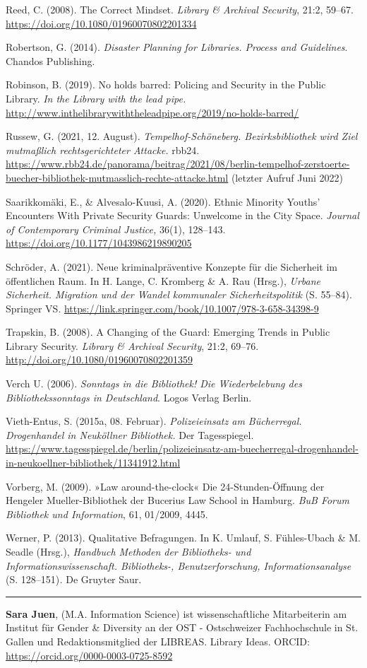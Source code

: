 \documentclass[a4paper,
fontsize=11pt,
oneside,
numbers=noperiodatend,
parskip=half-,
bibliography=totoc,
final
]{scrartcl}
\begin{document}
Reed, C. (2008). The Correct Mindset. \emph{Library \& Archival
Security}, 21:2, 59--67. \url{https://doi.org/10.1080/01960070802201334}

Robertson, G. (2014). \emph{Disaster Planning for Libraries. Process and
Guidelines}. Chandos Publishing.

Robinson, B. (2019). No holds barred: Policing and Security in the
Public Library. \emph{In the Library with the lead pipe.}
\url{http://www.inthelibrarywiththeleadpipe.org/2019/no-holds-barred/}

Russew, G. (2021, 12. August). \emph{Tempelhof-Schöneberg.
Bezirksbibliothek wird Ziel mutmaßlich rechtsgerichteter Attacke.}
rbb24.
\url{https://www.rbb24.de/panorama/beitrag/2021/08/berlin-tempelhof-zerstoerte-buecher-bibliothek-mutmasslich-rechte-attacke.html}
(letzter Aufruf Juni 2022)

Saarikkomäki, E., \& Alvesalo-Kuusi, A. (2020). Ethnic Minority Youths'
Encounters With Private Security Guards: Unwelcome in the City Space.
\emph{Journal of Contemporary Criminal Justice,} 36(1), 128--143.
\url{https://doi.org/10.1177/1043986219890205}

Schröder, A. (2021). Neue kriminalpräventive Konzepte für die Sicherheit
im öffentlichen Raum. In H. Lange, C. Kromberg \& A. Rau (Hrsg.),
\emph{Urbane Sicherheit. Migration und der Wandel kommunaler
Sicherheitspolitik} (S. 55--84). Springer VS.
\url{https://link.springer.com/book/10.1007/978-3-658-34398-9}

Trapskin, B. (2008). A Changing of the Guard: Emerging Trends in Public
Library Security. \emph{Library \& Archival Security}, 21:2, 69--76.
\url{http://doi.org/10.1080/01960070802201359}

Verch U. (2006). \emph{Sonntags in die Bibliothek! Die Wiederbelebung
des Bibliothekssonntags in Deutschland}. Logos Verlag Berlin.

Vieth-Entus, S. (2015a, 08. Februar). \emph{Polizeieinsatz am
Bücherregal. Drogenhandel in Neuköllner Bibliothek.} Der Tagesspiegel.
\url{https://www.tagesspiegel.de/berlin/polizeieinsatz-am-buecherregal-drogenhandel-in-neukoellner-bibliothek/11341912.html}

Vorberg, M. (2009). »Law around-the-clock« Die 24-Stunden-Öffnung der
Hengeler Mueller-Bibliothek der Bucerius Law School in Hamburg.
\emph{BuB Forum Bibliothek und Information}, 61, 01/2009, 4445.

Werner, P. (2013). Qualitative Befragungen. In K. Umlauf, S.
Fühles-Ubach \& M. Seadle (Hrsg.), \emph{Handbuch Methoden der
Bibliotheks- und Informationswissenschaft. Bibliotheks-,
Benutzerforschung, Informationsanalyse} (S. 128--151)\emph{.} De Gruyter
Saur.

\begin{center}\rule{0.5\linewidth}{0.5pt}\end{center}

\textbf{Sara Juen}, (M.A. Information Science) ist wissenschaftliche
Mitarbeiterin am Institut für Gender \& Diversity an der OST -
Ostschweizer Fachhochschule in St. Gallen und Redaktionsmitglied der
LIBREAS. Library Ideas. ORCID: \url{https://orcid.org/0000-0003-0725-8592}
\end{document}

